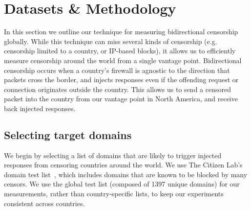 \section{Datasets \& Methodology}\label{sec:methodology}

In this section we outline our technique for measuring bidirectional censorship
globally. While this technique can miss several kinds of censorship (e.g.
censorship limited to a country, or IP-based blocks), it allows us to
efficiently measure censorship around the world from a single vantage point.
Bidirectional censorship occurs when a country's firewall is agnostic to the
direction that packets cross the border, and injects responses even if the
offending request or connection originates outside the country. This allows us
to send a censored packet into the country from our vantage point in
North America, and receive back injected responses.


\FigProbeSend

\subsection{Selecting target domains}
\label{sec:methodology:domains}
We begin by selecting a list of domains that are likely to trigger injected
responses from censoring countries around the world.
We use The Citizen Lab's~\cite{TheCitiz6:online} domain test
list~\cite{testlist}, which includes domains that are known to be blocked by
many censors. We use the global test list (composed of 1397 unique domains) for
our measurements, rather than country-specific lists, to keep our experiments
consistent across countries.


